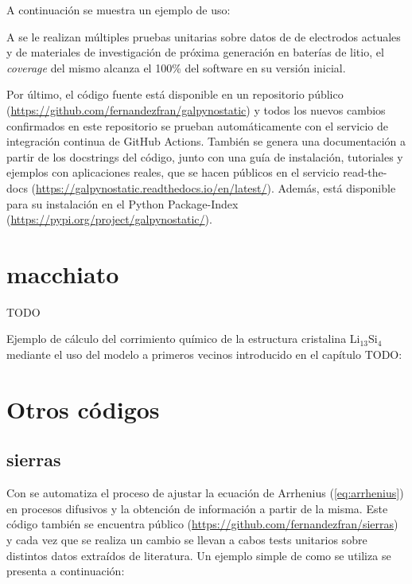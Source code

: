 A continuación se muestra un ejemplo de uso:



A  se le realizan múltiples pruebas unitarias sobre datos de
de electrodos actuales y de materiales de investigación de próxima generación en 
baterías de litio, el \textit{coverage} del mismo alcanza el 100\% del software
en su versión inicial.

Por último, el código fuente está disponible en un repositorio público 
(\url{https://github.com/fernandezfran/galpynostatic}) y todos los nuevos cambios 
confirmados en este repositorio se prueban automáticamente con el servicio de 
integración continua de GitHub Actions. También se genera una documentación a 
partir de los docstrings del código, junto con una guía de instalación,
tutoriales y ejemplos con aplicaciones reales, que se hacen públicos en el 
servicio read-the-docs (\url{https://galpynostatic.readthedocs.io/en/latest/}). 
Además,  está disponible para su instalación en el Python 
Package-Index (\url{https://pypi.org/project/galpynostatic/}).


\section{macchiato}

TODO

Ejemplo de cálculo del corrimiento químico de la estructura cristalina 
Li$_{13}$Si$_{4}$ mediante el uso del modelo a primeros vecinos introducido en 
el capítulo TODO:



\section{Otros códigos}

\subsection{sierras}
Con  se automatiza el proceso de ajustar la ecuación de Arrhenius 
(\ref{eq:arrhenius}) en procesos difusivos y la obtención de información a partir 
de la misma. Este código también se encuentra público 
(\url{https://github.com/fernandezfran/sierras}) y cada vez que se realiza un 
cambio se llevan a cabos tests unitarios sobre distintos datos extraídos de 
literatura. Un ejemplo simple de como se utiliza se presenta a continuación:

